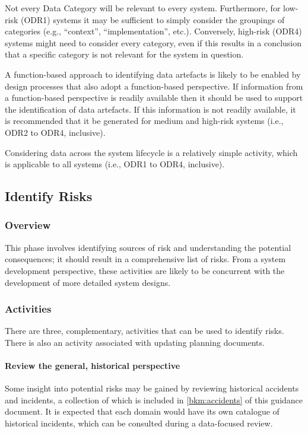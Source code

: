 Not every Data Category will be relevant to every system. Furthermore, for low-risk (ODR1) systems it may be sufficient to simply consider the groupings of categories (e.g., ``context'', ``implementation'', etc.). Conversely, high-risk (ODR4) systems might need to consider every category, even if this results in a conclusion that a specific category is not relevant for the system in question.

A function-based approach to identifying \glspl{data artefact} is likely to be enabled by design processes that also adopt a function-based perspective. If \gls{information} from a function-based perspective is readily available then it should be used to support the identification of \glspl{data artefact}. If this \gls{information} is not readily available, it is recommended that it be generated for medium and high-risk systems (i.e., ODR2 to ODR4, inclusive).

Considering data across the system lifecycle is a relatively simple activity, which is applicable to all systems (i.e., ODR1 to ODR4, inclusive).

\subsection{Identify Risks}
\subsubsection{Overview}
This phase involves identifying sources of risk and understanding the potential consequences; it should result in a comprehensive list of risks. From a system development perspective, these activities are likely to be concurrent with the development of more detailed system designs.

\subsubsection{Activities}
There are three, complementary, activities that can be used to identify risks. There is also an activity associated with updating planning documents.

\paragraph{Review the general, historical perspective}
Some insight into potential risks may be gained by reviewing historical accidents and incidents, a collection of which is included in
\autoref{bkm:accidents} of this guidance document. It is expected that each domain would have its own catalogue of historical incidents, which can be consulted during a data-focused review.

